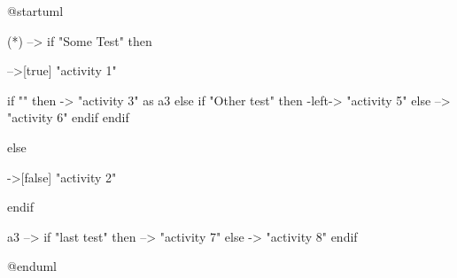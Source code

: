 @startuml

(*) --> if "Some Test" then

  -->[true] "activity 1"

  if "" then
    -> "activity 3" as a3
  else
    if "Other test" then
      -left-> "activity 5"
    else
      --> "activity 6"
    endif
  endif

else

  ->[false] "activity 2"

endif

a3 --> if "last test" then
  --> "activity 7"
else
  -> "activity 8"
endif

@enduml
